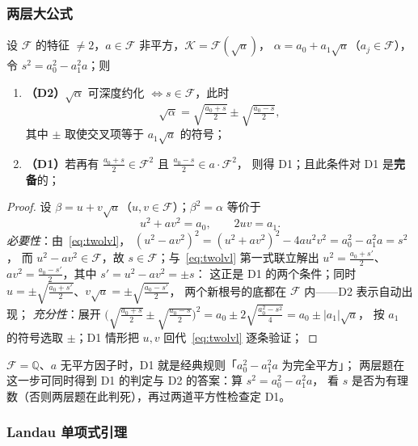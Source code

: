 \documentclass[UTF8,a4paper,11pt]{ctexart}
\begin{document}
\subsubsection{两层大公式}

\begin{theorem}[二次层的封闭公式]
\label{thm:two-level}
设 $\mathscr{F}$ 的特征 $\ne2$，$a\in \mathscr{F}$ 非平方，$\mathscr{K}=\mathscr{F}(\sqrt a)$，
$\alpha=a_0+a_1\sqrt a$（$a_j\in \mathscr{F}$），令 $s^2=a_0^2-a_1^2a$；则
\begin{enumerate}
\item \textbf{（D2）}$\sqrt{\alpha}$ 可深度约化 $\iff s\in \mathscr{F}$，此时
\[
\sqrt{\alpha}=\sqrt{\tfrac{a_0+s}{2}}\pm\sqrt{\tfrac{a_0-s}{2}},
\]
其中 $\pm$ 取使交叉项等于 $a_1\sqrt a$ 的符号；
\item \textbf{（D1）}若再有 $\tfrac{a_0+s}{2}\in \mathscr{F}^2$ 且 $\tfrac{a_0-s}{2}\in a\cdot \mathscr{F}^2$，
则得 D1；且此条件对 D1 是\textbf{完备}的；
\end{enumerate}
\end{theorem}

\begin{proof}
设 $\beta=u+v\sqrt a$（$u,v\in \mathscr{F}$）；$\beta^2=\alpha$ 等价于
\begin{equation}
\label{eq:twolvl}
u^2+av^2=a_0,\qquad 2uv=a_1 .
\end{equation}
\emph{必要性}：由~\eqref{eq:twolvl}，
$(u^2-av^2)^2=(u^2+av^2)^2-4au^2v^2=a_0^2-a_1^2a=s^2$，
而 $u^2-av^2\in \mathscr{F}$，故 $s\in \mathscr{F}$；与~\eqref{eq:twolvl} 第一式联立解出
$u^2=\tfrac{a_0+s'}2$、$av^2=\tfrac{a_0-s'}2$，其中 $s'=u^2-av^2=\pm s$：
这正是 D1 的两个条件；同时 $u=\pm\sqrt{\tfrac{a_0+s'}2}$、$v\sqrt a=\pm\sqrt{\tfrac{a_0-s'}2}$，
两个新根号的底都在 $\mathscr{F}$ 内——D2 表示自动出现；
\emph{充分性}：展开
$\bigl(\sqrt{\tfrac{a_0+s}{2}}\pm\sqrt{\tfrac{a_0-s}{2}}\bigr)^2
  =a_0\pm2\sqrt{\tfrac{a_0^2-s^2}4}=a_0\pm|a_1|\sqrt a$，
按 $a_1$ 的符号选取 $\pm$；D1 情形把 $u,v$ 回代~\eqref{eq:twolvl} 逐条验证；
\end{proof}

$\mathscr{F}=\mathbb{Q}$、$a$ 无平方因子时，D1 就是经典规则「$a_0^2-a_1^2a$ 为完全平方」；
两层题在这一步可同时得到 D1 的判定与 D2 的答案：算 $s^2=a_0^2-a_1^2a$，
看 $s$ 是否为有理数（否则两层题在此判死），再过两道平方性检查定 D1。\par

\subsubsection{Landau 单项式引理}
\end{document}
